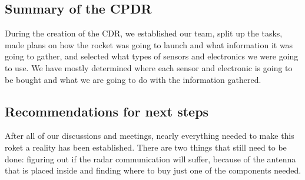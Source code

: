 \subsection{Summary of the CPDR}
During the creation of the CDR, we established our team, split up the tasks, made plans on how the rocket was going to launch and what information it was going to gather, and selected what types of sensors and electronics we were going to use. We have mostly determined where each sensor and electronic is going to be bought and what we are going to do with the information gathered.

\subsection{Recommendations for next steps}
After all of our discussions and meetings, nearly everything needed to make this roket a reality has been established. There are two things that still need to be done: figuring out if the radar communication will suffer, because of the antenna that is placed inside and finding where to buy just one of the components needed.

